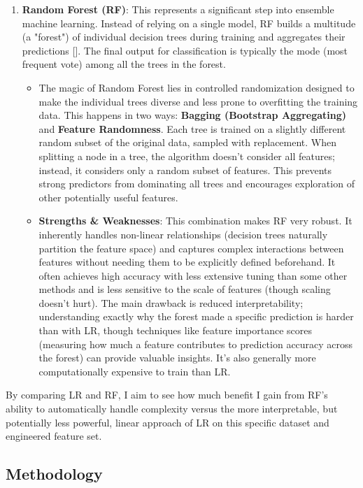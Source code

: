 \documentclass[a4paper,12pt]{article}
\begin{document}
\begin{enumerate}
\begin{itemize}
    \end{itemize}
    \item \textbf{Random Forest (RF)}: This represents a significant step into ensemble machine learning. Instead of relying on a single model, RF builds a multitude (a "forest") of individual decision trees during training and aggregates their predictions [\cite{breiman2001random}]. The final output for classification is typically the mode (most frequent vote) among all the trees in the forest.
    \begin{itemize}
        \item The magic of Random Forest lies in controlled randomization designed to make the individual trees diverse and less prone to overfitting the training data. This happens in two ways: \textbf{Bagging (Bootstrap Aggregating)} and \textbf{Feature Randomness}. Each tree is trained on a slightly different random subset of the original data, sampled with replacement. When splitting a node in a tree, the algorithm doesn't consider all features; instead, it considers only a random subset of features. This prevents strong predictors from dominating all trees and encourages exploration of other potentially useful features.
        \item \textbf{Strengths \& Weaknesses}: This combination makes RF very robust. It inherently handles non-linear relationships (decision trees naturally partition the feature space) and captures complex interactions between features without needing them to be explicitly defined beforehand. It often achieves high accuracy with less extensive tuning than some other methods and is less sensitive to the scale of features (though scaling doesn't hurt). The main drawback is reduced interpretability; understanding exactly why the forest made a specific prediction is harder than with LR, though techniques like feature importance scores (measuring how much a feature contributes to prediction accuracy across the forest) can provide valuable insights. It's also generally more computationally expensive to train than LR.
    \end{itemize}
\end{enumerate}

By comparing LR and RF, I aim to see how much benefit I gain from RF's ability to automatically handle complexity versus the more interpretable, but potentially less powerful, linear approach of LR on this specific dataset and engineered feature set.

\subsection{Methodology}
\end{document}
